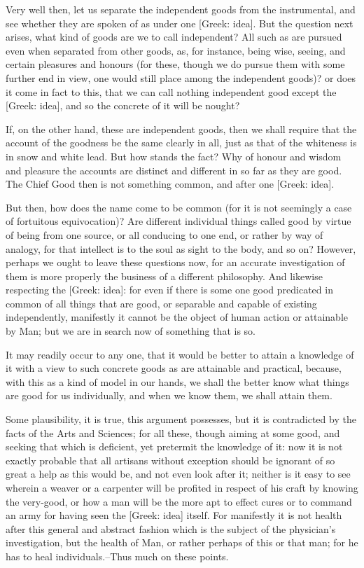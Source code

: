 Very well then, let us separate the independent goods from the
instrumental, and see whether they are spoken of as under one [Greek:
idea]. But the question next arises, what kind of goods are we to call
independent? All such as are pursued even when separated from other
goods, as, for instance, being wise, seeing, and certain pleasures and
honours (for these, though we do pursue them with some further end in
view, one would still place among the independent goods)? or does it
come in fact to this, that we can call nothing independent good except
the [Greek: idea], and so the concrete of it will be nought?

If, on the other hand, these are independent goods, then we shall
require that the account of the goodness be the same clearly in all,
just as that of the whiteness is in snow and white lead. But how stands
the fact? Why of honour and wisdom and pleasure the accounts are
distinct and different in so far as they are good. The Chief Good then
is not something common, and after one [Greek: idea].

But then, how does the name come to be common (for it is not seemingly a
case of fortuitous equivocation)? Are different individual things called
good by virtue of being from one source, or all conducing to one end, or
rather by way of analogy, for that intellect is to the soul as sight to
the body, and so on? However, perhaps we ought to leave these questions
now, for an accurate investigation of them is more properly the business
of a different philosophy. And likewise respecting the [Greek: idea]:
for even if there is some one good predicated in common of all things
that are good, or separable and capable of existing independently,
manifestly it cannot be the object of human action or attainable by Man;
but we are in search now of something that is so.

It may readily occur to any one, that it would be better to attain a
knowledge of it with a view to such concrete goods as are attainable and
practical, because, with this as a kind of model in our hands, we shall
the better know what things are good for us individually, and when we
know them, we shall attain them.

Some plausibility, it is true, this argument possesses, but it is
contradicted by the facts of the Arts and Sciences; for all these,
though aiming at some good, and seeking that which is deficient, yet
pretermit the knowledge of it: now it is not exactly probable that all
artisans without exception should be ignorant of so great a help as this
would be, and not even look after it; neither is it easy to see wherein
a weaver or a carpenter will be profited in respect of his craft by
knowing the very-good, or how a man will be the more apt to effect cures
or to command an army for having seen the [Greek: idea] itself. For
manifestly it is not health after this general and abstract fashion
which is the subject of the physician's investigation, but the health
of Man, or rather perhaps of this or that man; for he has to heal
individuals.--Thus much on these points.


